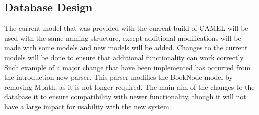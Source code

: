 \subsection{Database Design}
	The current model that was provided with the current build of CAMEL will be used with the same naming structure, except additional modifications will be made with some models and new models will be added. Changes to the current models will be done to ensure that additional functionality can work correctly. Such example of a major change that have been implemented has occurred from the introduction new parser. This parser modifies the BookNode model by removing Mpath, as it is not longer required. The main aim of the changes to the database it to ensure compatibility with newer functionality, though it will not have a large impact for usability with the new system.\\